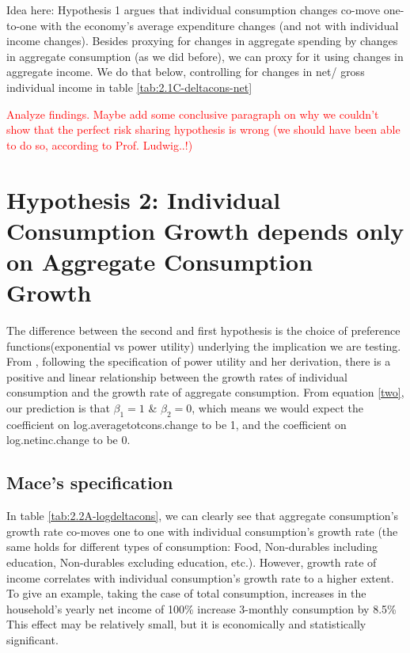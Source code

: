 \documentclass[12pt,a4paper]{article}
\begin{document}
Idea here: Hypothesis 1 argues that individual consumption changes co-move one-to-one with the economy's average expenditure changes (and not with individual income changes). Besides proxying for changes in aggregate spending by changes in aggregate consumption (as we did before), we can proxy for it using changes in aggregate income. We do that below, controlling for changes in net/ gross individual income in table \ref{tab:2.1C-deltacons-net}



\textcolor{red}{Analyze findings. Maybe add some conclusive paragraph on why we couldn't show that the perfect risk sharing hypothesis is wrong (we should have been able to do so, according to Prof. Ludwig..!)}

\section*{Hypothesis 2: Individual Consumption Growth depends only on Aggregate Consumption Growth}
The difference between the second and first hypothesis is the choice of preference functions(exponential vs power utility) underlying the implication we are testing. From \citealp{mace1991}, following the specification of power utility and her derivation, there is a positive and linear relationship between the growth rates of individual consumption and the growth rate of aggregate consumption. From equation \eqref{two}, our prediction is that $\beta_1=1$ \& $\beta_2=0$, which means we would expect the coefficient on log.averagetotcons.change to be 1, and the coefficient on log.netinc.change to be 0.

\subsection*{Mace's specification}

In table \ref{tab:2.2A-logdeltacons}, we can clearly see that aggregate consumption's growth rate co-moves one to one with individual consumption's growth rate (the same holds for different types of consumption: Food, Non-durables including education, Non-durables excluding education, etc.). However,  growth rate of income correlates with individual consumption's growth rate to a higher extent. To give an example, taking the case of total consumption, increases in the household's yearly net income of 100\% increase 3-monthly consumption by 8.5\% This effect may be relatively small, but it is economically and statistically significant.  \\
\end{document}
